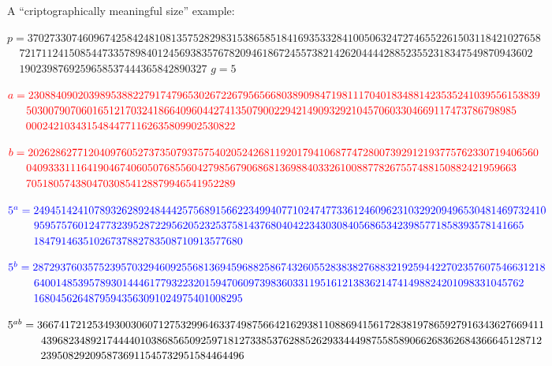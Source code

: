 \documentclass[landscape,display]{powersem}%
\newcommand{\heading}[1]{%
 \begin{center}
  \large\bf
  \shadowbox{{\textcolor{conceptcolor}{#1}}}%
 \end{center}
 \vspace{1ex minus 1ex}}
\begin{document}
\begin{slide}
\heading{Diffie--Hellmann key exchange 5/5}\pause

A ``criptographically meaningful size'' example:\pause

\begin{tiny}
$p=370273307460967425842481081357528298315386585184169353328410050632472746552261503118421027658$
  $\ \ \ \ \ 721711241508544733578984012456938357678209461867245573821426204444288523552318347549870943602$
  $\ \ \ \ \ 1902398769259658537444365842890327$
\pause $g=5$\pause

$\textcolor{red}{a=230884090203989538822791747965302672267956566803890984719811170401834881423535241039556153839}$
$\textcolor{red}{\ \ \ \ \
50300790706016512170324186640960442741350790022942149093292104570603304669117473786798985}$
$\textcolor{red}{\ \ \ \ \
00024210343154844771162635809902530822}$\pause

$\textcolor{red}{b=202628627712040976052737350793757540205242681192017941068774728007392912193775762330719406560}$
$\textcolor{red}{\ \ \ \ \
04093331116419046740605076855604279856790686813698840332610088778267557488150882421959663}$
$\textcolor{red}{\ \ \ \ \
70518057438047030854128879946541952289}$\pause

$\textcolor{blue}{5^a=249451424107893262892484442575689156622349940771024747733612460962310329209496530481469732410}$
$\textcolor{blue}{\ \ \ \ \ \ \
95957576012477323952872295620523253758143768040422343030840568653423985771858393578141665}$
$\textcolor{blue}{\ \ \ \ \ \ \
18479146351026737882783508710913577680}$\pause

$\textcolor{blue}{5^b=287293760357523957032946092556813694596882586743260552838382768832192594422702357607546631218}$
$\textcolor{blue}{\ \ \ \ \ \ \
64001485395789301444617793223201594706097398360331195161213836214741498824201098331045762}$
$\textcolor{blue}{\ \ \ \ \ \ \
16804562648795943563091024975401008295}$\pause\vspace{-2mm}

$\textcolor{black}{5^{ab}=36674172125349300306071275329964633749875664216293811088694156172838197865927916343627669411}$\vspace{-2.5mm}
$\textcolor{black}{\ \ \ \ \ \ \ \ \ 4396823489217444401038685650925971812733853762885262933444987558589066268362684366645128712}$\vspace{-2.5mm}
$\textcolor{black}{\ \ \ \ \ \ \ \ \ 2395082920958736911545732951584464496}$
\end{tiny}

\end{slide}
\end{document}
